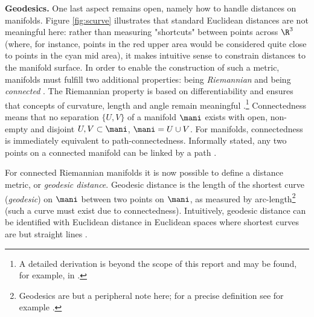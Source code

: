 \vspace{0.5cm}

\textbf{Geodesics.} One last aspect remains open, namely how to handle distances 
on manifolds.
Figure \ref{fig:scurve} illustrates that standard Euclidean distances are not
meaningful here: rather than measuring "shortcuts" between points across 
$\R^3$ (where, for instance, points in the red upper area would be considered
quite close to points in the cyan mid area), it makes intuitive sense to 
constrain distances to the manifold surface.
In order to enable the construction of such a metric, manifolds must fulfill
two additional properties: being \textit{Riemannian} and being 
\textit{connected} \citep{mafu2011}.
The Riemannian property is based on differentiability and ensures that concepts 
of curvature, length and angle remain meaningful \citep{mafu2011}.\footnote{
A detailed derivation is beyond the scope of this report and may be found, for
example, in \citet{mukherjee2015}.
}
Connectedness means that no separation $\{ U, V\}$ of a manifold $\mani$
exists with open, non-empty and disjoint $U, V \subset \mani$, 
$\mani = U \cup V$.
For manifolds, connectedness is immediately equivalent to path-connectedness.
Informally stated, any two points on a connected manifold can be linked by a 
path
\citep{mccleary2006}.

For connected Riemannian manifolds it is now possible to define a distance 
metric, or \textit{geodesic distance}.
Geodesic distance is the length of the shortest curve (\textit{geodesic}) on
$\mani$ between two points on $\mani$, as measured by arc-length\footnote{
Geodesics are but a peripheral note here; for a precise definition see for 
example \citet{mafu2011}.
} (such 
a curve must exist due to connectedness).
Intuitively, geodesic distance can be identified with Euclidean distance in
Euclidean spaces where shortest curves are but straight lines \citep{mafu2011}.

% 



